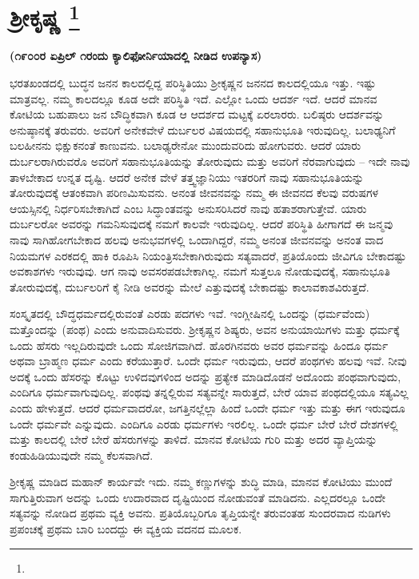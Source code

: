 
\chapter[ಶ‍್ರೀಕೃಷ್ಣ ]{ಶ‍್ರೀಕೃಷ್ಣ \protect\footnote{}}

\centerline{\textbf{(೧೯೦೦ರ ಏಪ್ರಿಲ್​ ೧ರಂದು ಕ್ಯಾಲಿಫೋರ್ನಿಯಾದಲ್ಲಿ ನೀಡಿದ ಉಪನ್ಯಾಸ)}}

ಭರತಖಂಡದಲ್ಲಿ ಬುದ್ಧನ ಜನನ ಕಾಲದಲ್ಲಿದ್ದ ಪರಿಸ್ಥಿತಿಯು ಶ‍್ರೀಕೃಷ್ಣನ ಜನನದ ಕಾಲದಲ್ಲಿಯೂ ಇತ್ತು. ಇಷ್ಟು ಮಾತ್ರವಲ್ಲ. ನಮ್ಮ ಕಾಲದಲ್ಲೂ ಕೂಡ ಅದೇ ಪರಿಸ್ಥಿತಿ ಇದೆ. ಎಲ್ಲೋ ಒಂದು ಆದರ್ಶ ಇದೆ. ಆದರೆ ಮಾನವ ಕೋಟಿಯ ಬಹುಪಾಲು ಜನ ಬೌದ್ಧಿಕವಾಗಿ ಕೂಡ ಆ ಆದರ್ಶದ ಮಟ್ಟಕ್ಕೆ ಏರಲಾರರು. ಬಲಿಷ್ಠರು ಆದರ್ಶವನ್ನು ಅನುಷ್ಠಾನಕ್ಕೆ ತರುವರು. ಅವರಿಗೆ ಅನೇಕವೇಳೆ ದುರ್ಬಲರ ವಿಷಯದಲ್ಲಿ ಸಹಾನುಭೂತಿ ಇರುವುದಿಲ್ಲ. ಬಲಾಢ್ಯನಿಗೆ ಬಲಹೀನನು ಭಿಕ್ಷುಕನಂತೆ ಕಾಣುವನು. ಬಲಾಢ್ಯರೇನೋ ಮುಂದುವರಿದು ಹೋಗುವರು. ಆದರೆ ಯಾರು ದುರ್ಬಲರಾಗಿರುವರೊ ಅವರಿಗೆ ಸಹಾನುಭೂತಿಯನ್ನು ತೋರುವುದು ಮತ್ತು ಅವರಿಗೆ ನೆರವಾಗುವುದು – ಇದೇ ನಾವು ತಾಳಬೇಕಾದ ಉನ್ನತ ದೃಷ್ಟಿ. ಆದರೆ ಅನೇಕ ವೇಳೆ ತತ್ತ್ವಜ್ಞಾನಿಯು ಇತರರಿಗೆ ನಾವು ಸಹಾನುಭೂತಿಯನ್ನು ತೋರುವುದಕ್ಕೆ ಆತಂಕವಾಗಿ ಪರಿಣಮಿಸುವನು. ಅನಂತ ಜೀವನವನ್ನು ನಮ್ಮ ಈ ಜೀವನದ ಕೆಲವು ವರುಷಗಳ ಆಯಸ್ಸಿನಲ್ಲಿ ನಿರ್ಧರಿಸಬೇಕಾಗಿದೆ ಎಂಬ ಸಿದ್ಧಾಂತವನ್ನು ಅನುಸರಿಸಿದರೆ ನಾವು ಹತಾಶರಾಗುತ್ತೇವೆ. ಯಾರು ದುರ್ಬಲರೋ ಅವರನ್ನು ಗಮನಿಸುವುದಕ್ಕೆ ನಮಗೆ ಕಾಲವೇ ಇರುವುದಿಲ್ಲ. ಆದರೆ ಪರಿಸ್ಥಿತಿ ಹೀಗಾಗದೆ ಈ ಜನ್ಮವು ನಾವು ಸಾಗಿಹೋಗಬೇಕಾದ ಹಲವು ಅನುಭವಗಳಲ್ಲಿ ಒಂದಾಗಿದ್ದರೆ, ನಮ್ಮ ಅನಂತ ಜೀವನವನ್ನು ಅನಂತ ವಾದ ನಿಯಮಗಳ ಎರಕದಲ್ಲಿ ಹಾಕಿ ರೂಪಿಸಿ ನಿಯಂತ್ರಿಸಬೇಕಾಗಿರುವುದು ಸತ್ಯವಾದರೆ, ಪ್ರತಿಯೊಂದು ಜೀವಿಗೂ ಬೇಕಾದಷ್ಟು ಅವಕಾಶಗಳು ಇರುವುವು. ಆಗ ನಾವು ಅವಸರಪಡಬೇಕಾಗಿಲ್ಲ. ನಮಗೆ ಸುತ್ತಲೂ ನೋಡುವುದಕ್ಕೆ, ಸಹಾನುಭೂತಿ ತೋರುವುದಕ್ಕೆ, ದುರ್ಬಲರಿಗೆ ಕೈ ನೀಡಿ ಅವರನ್ನು ಮೇಲೆ ಎತ್ತುವುದಕ್ಕೆ ಬೇಕಾದಷ್ಟು ಕಾಲಾವಕಾಶವಿರುತ್ತದೆ.

ಸಂಸ್ಕೃತದಲ್ಲಿ ಬೌದ್ಧಧರ್ಮದಲ್ಲಿರುವಂತೆ ಎರಡು ಪದಗಳು ಇವೆ. ಇಂಗ್ಲೀಷಿನಲ್ಲಿ ಒಂದನ್ನು  (ಧರ್ಮವೆಂದು) ಮತ್ತೊಂದನ್ನು  (ಪಂಥ) ಎಂದು ಅನುವಾದಿಸುವರು. ಶ‍್ರೀಕೃಷ್ಣನ ಶಿಷ್ಯರು, ಅವನ ಅನುಯಾಯಿಗಳು ಮತ್ತು ಧರ್ಮಕ್ಕೆ ಒಂದು ಹೆಸರು ಇಲ್ಲದಿರುವುದೇ ಒಂದು ಸೋಜಿಗವಾಗಿದೆ. ಹೊರಗಿನವರು ಅವರ ಧರ್ಮವನ್ನು ಹಿಂದೂ ಧರ್ಮ ಅಥವಾ ಬ್ರಾಹ್ಮಣ ಧರ್ಮ ಎಂದು ಕರೆಯುತ್ತಾರೆ. ಒಂದೇ ಧರ್ಮ ಇರುವುದು, ಆದರೆ ಪಂಥಗಳು ಹಲವು ಇವೆ. ನೀವು ಅದಕ್ಕೆ ಒಂದು ಹೆಸರನ್ನು ಕೊಟ್ಟು ಉಳಿದವುಗಳಿಂದ ಅದನ್ನು ಪ್ರತ್ಯೇಕ ಮಾಡಿದೊಡನೆ ಅದೊಂದು ಪಂಥವಾಗುವುದು, ಎಂದಿಗೂ ಧರ್ಮವಾಗುವುದಿಲ್ಲ. ಪಂಥವು ತನ್ನಲ್ಲಿರುವ ಸತ್ಯವನ್ನೇ ಸಾರುತ್ತದೆ, ಬೇರೆ ಯಾವ ಪಂಥದಲ್ಲಿಯೂ ಸತ್ಯವಿಲ್ಲ ಎಂದು ಹೇಳುತ್ತದೆ. ಆದರೆ ಧರ್ಮವಾದರೋ, ಜಗತ್ತಿನಲ್ಲೆಲ್ಲಾ ಹಿಂದೆ ಒಂದೇ ಧರ್ಮ ಇತ್ತು ಮತ್ತು ಈಗ ಇರುವುದೂ ಒಂದೇ ಧರ್ಮವೇ ಎನ್ನುವುದು. ಎಂದಿಗೂ ಎರಡು ಧರ್ಮಗಳು ಇರಲಿಲ್ಲ. ಒಂದೇ ಧರ್ಮ ಬೇರೆ ಬೇರೆ ದೇಶಗಳಲ್ಲಿ ಮತ್ತು ಕಾಲದಲ್ಲಿ ಬೇರೆ ಬೇರೆ ಹೆಸರುಗಳನ್ನು ತಾಳಿದೆ. ಮಾನವ ಕೋಟಿಯ ಗುರಿ ಮತ್ತು ಅದರ ವ್ಯಾಪ್ತಿಯನ್ನು ಕಂಡುಹಿಡಿಯುವುದೇ ನಮ್ಮ ಕೆಲಸವಾಗಿದೆ.

ಶ‍್ರೀಕೃಷ್ಣ ಮಾಡಿದ ಮಹಾನ್​ ಕಾರ್ಯವೇ ಇದು. ನಮ್ಮ ಕಣ್ಣುಗಳನ್ನು ಶುದ್ಧಿ ಮಾಡಿ, ಮಾನವ ಕೋಟಿಯು ಮುಂದೆ ಸಾಗುತ್ತಿರುವಾಗ ಅದನ್ನು ಒಂದು ಉದಾರವಾದ ದೃಷ್ಟಿಯಿಂದ ನೋಡುವಂತೆ ಮಾಡಿದನು. ಎಲ್ಲದರಲ್ಲೂ ಒಂದೇ ಸತ್ಯವನ್ನು ನೋಡಿದ ಪ್ರಥಮ ವ್ಯಕ್ತಿ ಅವನು. ಪ್ರತಿಯೊಬ್ಬರಿಗೂ ತೃಪ್ತಿಯನ್ನೇ ತರುವಂತಹ ಸುಂದರವಾದ ನುಡಿಗಳು ಪ್ರಪಂಚಕ್ಕೆ ಪ್ರಥಮ ಬಾರಿ ಬಂದದ್ದು ಈ ವ್ಯಕ್ತಿಯ ವದನದ ಮೂಲಕ.

